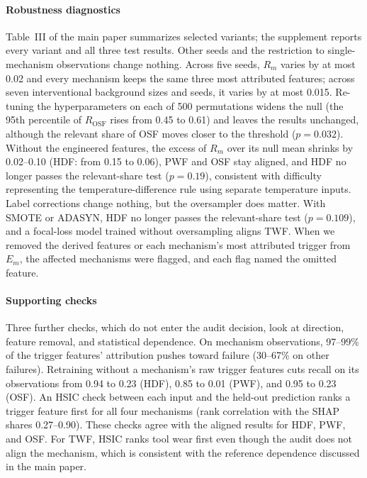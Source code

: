 \documentclass[10pt]{article}
\begin{document}
\paragraph{Robustness diagnostics} Table~III of the main paper summarizes selected variants; the supplement reports every variant and all three test results. Other seeds and the restriction to single-mechanism observations change nothing. Across five seeds, $R_m$ varies by at most 0.02 and every mechanism keeps the same three most attributed features; across seven interventional background sizes and seeds, it varies by at most 0.015. Re-tuning the hyperparameters on each of 500 permutations widens the null (the 95th percentile of $R_{\mathrm{OSF}}$ rises from 0.45 to 0.61) and leaves the results unchanged, although the relevant share of OSF moves closer to the threshold ($p=0.032$). Without the engineered features, the excess of $R_m$ over its null mean shrinks by 0.02--0.10 (HDF: from 0.15 to 0.06), PWF and OSF stay aligned, and HDF no longer passes the relevant-share test ($p=0.19$), consistent with difficulty representing the temperature-difference rule using separate temperature inputs. Label corrections change nothing, but the oversampler does matter. With SMOTE or ADASYN, HDF no longer passes the relevant-share test ($p=0.109$), and a focal-loss model trained without oversampling aligns TWF. When we removed the derived features or each mechanism's most attributed trigger from $E_m$, the affected mechanisms were flagged, and each flag named the omitted feature.

\paragraph{Supporting checks} Three further checks, which do not enter the audit decision, look at direction, feature removal, and statistical dependence. On mechanism observations, 97--99\% of the trigger features' attribution pushes toward failure (30--67\% on other failures). Retraining without a mechanism's raw trigger features cuts recall on its observations from 0.94 to 0.23 (HDF), 0.85 to 0.01 (PWF), and 0.95 to 0.23 (OSF). An HSIC check between each input and the held-out prediction ranks a trigger feature first for all four mechanisms (rank correlation with the SHAP shares 0.27--0.90). These checks agree with the aligned results for HDF, PWF, and OSF. For TWF, HSIC ranks tool wear first even though the audit does not align the mechanism, which is consistent with the reference dependence discussed in the main paper.
\end{document}
